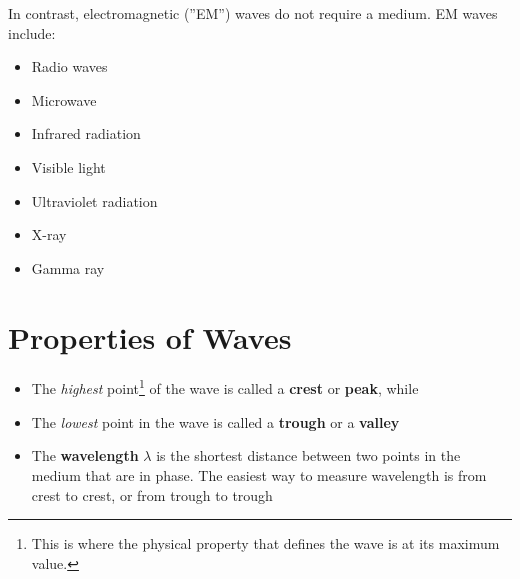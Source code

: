In contrast, electromagnetic (''EM'') waves do not require a medium. EM waves
include:
\begin{itemize}
\item Radio waves
\item Microwave
\item Infrared radiation
\item Visible light
\item Ultraviolet radiation
\item X-ray
\item Gamma ray
\end{itemize}
%
%
%
%
%
%
%
\section{Properties of Waves}
%
\begin{itemize}
\item The \emph{highest} point\footnote{This is where the physical property
that defines the wave is at its maximum value.} of the wave is called a
  \textbf{crest} or \textbf{peak}, while
\item The \emph{lowest} point in the wave is called a \textbf{trough} or a
  \textbf{valley}
\item The \textbf{wavelength} $\lambda$ is the shortest distance between two
  points in the medium that are in phase. The easiest way to measure
  wavelength is from crest to crest, or from trough to trough
\end{itemize}

